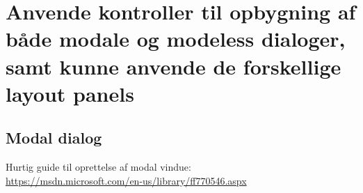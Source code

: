 \section{Anvende kontroller til opbygning af både modale og modeless dialoger, samt kunne anvende de forskellige layout panels}\label{sec:spm3}


\subsection{Modal dialog}

Hurtig guide til oprettelse af modal vindue:\\
\url{https://msdn.microsoft.com/en-us/library/ff770546.aspx}